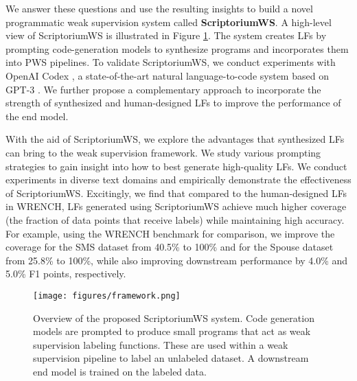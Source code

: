 
We answer these questions and use the resulting insights to build a novel programmatic weak supervision system called \textbf{ScriptoriumWS}. A high-level view of ScriptoriumWS is illustrated in Figure \ref{fig:framework}. The system creates LFs by prompting code-generation models to synthesize programs and incorporates them into PWS pipelines. To validate ScriptoriumWS, we conduct experiments with OpenAI Codex \cite{chen2021evaluating}, a state-of-the-art natural language-to-code system based on GPT-3 \cite{brown2020language}. We further propose a complementary approach to incorporate the strength of synthesized and human-designed LFs to improve the performance of the end model.


With the aid of ScriptoriumWS, we explore the advantages that synthesized LFs can bring to the weak supervision framework. 
%
We study various prompting strategies to gain insight into how to best generate high-quality LFs. 
%
We conduct experiments in diverse text domains and empirically demonstrate the effectiveness of ScriptoriumWS. 
%
Excitingly, we find that compared to the human-designed LFs in WRENCH, LFs generated using ScriptoriumWS achieve much higher coverage (the fraction of data points that receive labels) while maintaining high accuracy. 
%
For example, using the WRENCH benchmark \cite{zhang2021wrench} for comparison, we improve the coverage for the SMS dataset from 40.5\% to 100\% and for the Spouse dataset from 25.8\% to 100\%, while also improving downstream performance by 4.0\% and 5.0\% F1 points, respectively. 

\begin{figure}[t!]
    \texttt{[image: figures/framework.png]}
    \centering
    \caption{\small Overview of the proposed ScriptoriumWS system. Code generation models are prompted to produce small programs that act as weak supervision labeling functions. These are used within a weak supervision pipeline to label an unlabeled dataset. A downstream end model is trained on the labeled data.}
    \label{fig:framework}
\end{figure}